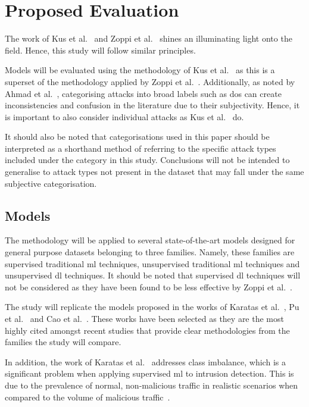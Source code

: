 \chapter{Proposed Evaluation}%
\label{chp:evaluation}

The work of Kus et al.~\cite{Kus} and Zoppi et al.~\cite{Zoppi} shines an
illuminating light onto the field. Hence, this study will follow similar
principles.

Models will be evaluated using the methodology of Kus et al.~\cite{Kus} as this
is a superset of the methodology applied by Zoppi et al.~\cite{Zoppi}.
Additionally, as noted by Ahmad et al.~\cite{zero-day}, categorising attacks
into broad labels such as \gls{dos} can create inconsistencies and confusion in
the literature due to their subjectivity. Hence, it is important to also
consider individual attacks as Kus et al.~\cite{Kus} do.

It should also be noted that categorisations used in this paper should be
interpreted as a shorthand method of referring to the specific attack types
included under the category in this study. Conclusions will not be intended to
generalise to attack types not present in the dataset that may fall under the
same subjective categorisation.

\section{Models}%
\label{sec:models}

The methodology will be applied to several state-of-the-art models designed for
general purpose datasets belonging to three families. Namely, these families
are supervised traditional \gls{ml} techniques, unsupervised traditional
\gls{ml} techniques and unsupervised \gls{dl} techniques. It should be noted
that supervised \gls{dl} techniques will not be considered as they have been
found to be less effective by Zoppi et al.~\cite{Zoppi}.

The study will replicate the models proposed in the works of Karatas et
al.~\cite{Karatas}, Pu et al.~\cite{Pu} and Cao et al.~\cite{Cao}. These works
have been selected as they are the most highly cited amongst recent studies
that provide clear methodologies from the families the study will compare.

In addition, the work of Karatas et al.~\cite{Karatas} addresses class
imbalance, which is a significant problem when applying supervised \gls{ml} to
intrusion detection. This is due to the prevalence of normal, non-malicious
traffic in realistic scenarios when compared to the volume of malicious
traffic~\cite{imbalance}.

